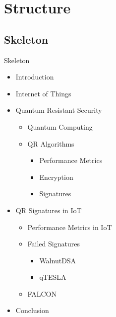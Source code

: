 \documentclass[ucs,10pt]{beamer}
\begin{document}
\section{Structure}
\subsection{Skeleton}

\begin{frame}{Skeleton}
  \begin{itemize}
      \item Introduction
    
      \item Internet of Things
      
      \item Quantum Resistant Security
          \begin{itemize}
            \item Quantum Computing
            \item QR Algorithms
            \begin{itemize}
              \item Performance Metrics
              \item Encryption
              \item Signatures
            \end{itemize}
          \end{itemize}
      
      \item QR Signatures in IoT 
      \begin{itemize}
        \item Performance Metrics in IoT
        \item Failed Signatures
        \begin{itemize}
          \item WalnutDSA
          \item qTESLA
        \end{itemize}
        \item FALCON
      \end{itemize}
      
      
      \item {Conclusion}
  \end{itemize}
  
\end{frame}
\end{document}
